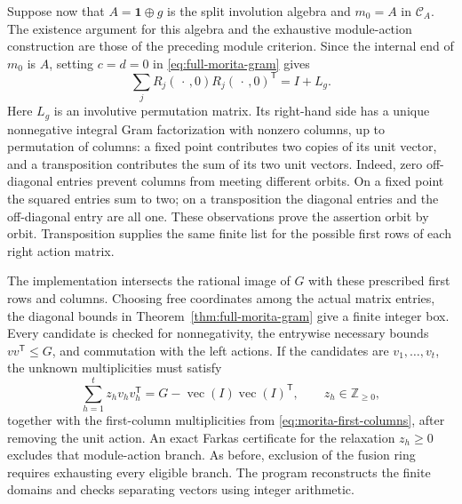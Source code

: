 Suppose now that $A=\mathbf1\oplus g$ is the split involution algebra and
$m_0=A$ in $\mathcal C_A$. The existence argument for this algebra and the
exhaustive module-action construction are those of the preceding module
criterion. Since the internal end of $m_0$ is $A$, setting $c=d=0$ in
\eqref{eq:full-morita-gram} gives
\begin{equation}\label{eq:morita-first-columns}
 \sum_j R_j(\,\cdot\,,0)R_j(\,\cdot\,,0)^{\mathsf T}=I+L_g.
\end{equation}
Here $L_g$ is an involutive permutation matrix. Its right-hand side has
a unique nonnegative integral Gram factorization with nonzero columns,
up to permutation of columns: a fixed point contributes two copies of its unit vector, and
a transposition contributes the sum of its two unit vectors. Indeed,
zero off-diagonal entries prevent columns from meeting different
orbits. On a fixed point the squared entries sum to two; on a
transposition the diagonal entries and the off-diagonal entry are all
one. These observations prove the assertion orbit by orbit.
Transposition supplies the same finite list for the possible first rows
of each right action matrix.

The implementation intersects the rational image of $G$ with these
prescribed first rows and columns. Choosing free coordinates among the
actual matrix entries, the diagonal bounds in
Theorem~\ref{thm:full-morita-gram} give a finite integer box. Every
candidate is checked for nonnegativity, the entrywise necessary bounds
$vv^{\mathsf T}\leq G$, and commutation with the left actions. If the
candidates are $v_1,\ldots,v_t$, the unknown multiplicities must satisfy
\[
 \sum_{h=1}^t z_hv_hv_h^{\mathsf T}
       =G-\operatorname{vec}(I)\operatorname{vec}(I)^{\mathsf T},
 \qquad z_h\in\mathbb Z_{\geq0},
\]
together with the first-column multiplicities from
\eqref{eq:morita-first-columns}, after removing the unit action.
An exact Farkas certificate for the relaxation $z_h\geq0$ excludes that
module-action branch. As before, exclusion of the fusion ring requires
exhausting every eligible branch. The program
 reconstructs the finite domains
and checks separating vectors using integer arithmetic.

